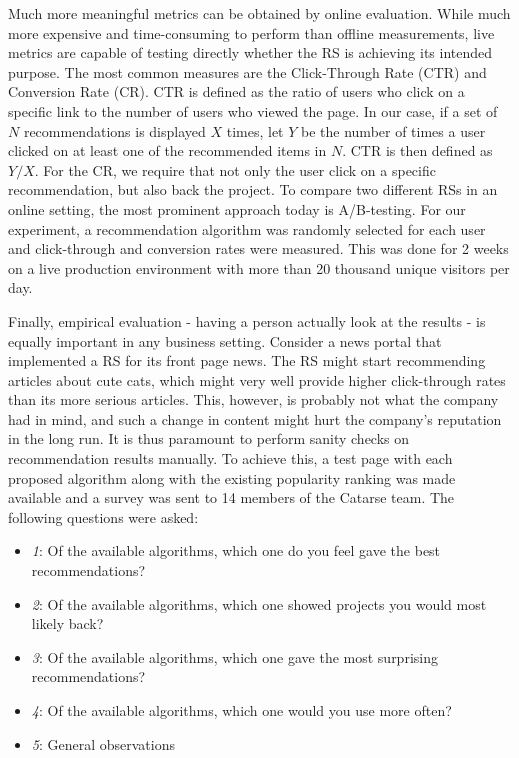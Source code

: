 \documentclass[cic,tc,english]{iiufrgs}
\begin{document}
Much more meaningful metrics can be obtained by online evaluation. While much more expensive and time-consuming to perform than offline measurements, live metrics are capable of testing directly whether the RS is achieving its intended purpose. The most common measures are the Click-Through Rate (CTR) and Conversion Rate (CR). CTR is defined as the ratio of users who click on a specific link to the number of users who viewed the page. In our case, if a set of $N$ recommendations is displayed $X$ times, let $Y$ be the number of times a user clicked on at least one of the recommended items in $N$. CTR is then defined as $Y/X$. For the CR, we require that not only the user click on a specific recommendation, but also back the project. To compare two different RSs in an online setting, the most prominent approach today is A/B-testing. For our experiment, a recommendation algorithm was randomly selected for each user and click-through and conversion rates were measured. This was done for 2 weeks on a live production environment with more than 20 thousand unique visitors per day.

Finally, empirical evaluation - having a person actually look at the results - is equally important in any business setting. Consider a news portal that implemented a RS for its front page news. The RS might start recommending articles about cute cats, which might very well provide higher click-through rates than its more serious articles. This, however, is probably not what the company had in mind, and such a change in content might hurt the company's reputation in the long run. It is thus paramount to perform sanity checks on recommendation results manually. To achieve this, a test page with each proposed algorithm along with the existing popularity ranking was made available and a survey was sent to 14 members of the Catarse team. The following questions were asked:

\begin{itemize}
    \item \emph{1}: Of the available algorithms, which one do you feel gave the best recommendations?
    \item \emph{2}: Of the available algorithms, which one showed projects you would most likely back?
    \item \emph{3}: Of the available algorithms, which one gave the most surprising recommendations?
    \item \emph{4}: Of the available algorithms, which one would you use more often?
    \item \emph{5}: General observations
\end{itemize}
\end{document}
